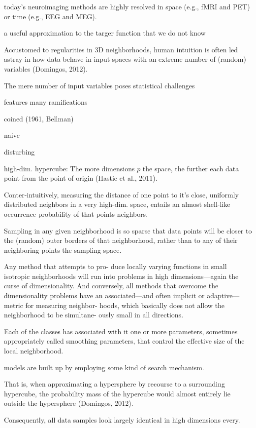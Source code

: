 \documentclass[authoryear,review,3p]{elsarticle}
\begin{document}
today's neuroimaging methods are highly resolved in
space (e.g., fMRI and PET)
or
time (e.g., EEG and MEG).


a useful approximation to the targer function that
we do not know


Accustomed to regularities in 3D neighborhoods,
human intuition is often led astray in
how data behave in
input spaces with an extreme number of (random) variables
(Domingos, 2012).


The mere number of input variables poses
statistical challenges

features many ramifications

coined (1961, Bellman)

naive

disturbing


high-dim. hypercube: 
The more dimensions $p$ the space,
the further each data point from the point of origin
(Hastie et al., 2011).

Conter-intuitively,
measuring the distance of one point to it's close,
uniformly distributed neighbors
in a very high-dim. space,
entails an almost shell-like occurrence probability of
that points neighbors.

Sampling in any given neighborhood is so sparse that
data points will be closer to the (random) outer borders of that neighborhood,
rather than to any of their neighboring points the sampling space.


Any method that attempts to pro- duce locally varying functions in small isotropic neighborhoods will run into problems in high dimensions—again the curse of dimensionality. And conversely, all methods that overcome the dimensionality problems have an associated—and often implicit or adaptive—metric for measuring neighbor- hoods, which basically does not allow the neighborhood to be simultane- ously small in all directions.

Each of the classes has associated with it one or more parameters, sometimes appropriately called smoothing parameters, that control the effective size of the local neighborhood.

models are built up by employing some kind of search mechanism.


That is,
when approximating a hypersphere by recourse to a surrounding hypercube,
the probability mass of the hypercube
would almost entirely lie outside the hypersphere
(Domingos, 2012).


Consequently, all data samples look largely identical
in high dimensions every.
\end{document}
